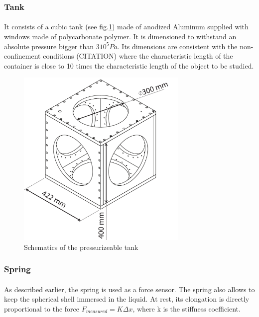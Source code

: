 \subsubsection{Tank}
\paragraph{}
It consists of a cubic tank (see fig.\ref{fig:tank}) made of anodized Aluminum supplied with windows made of polycarbonate polymer. It is dimensioned to withstand an absolute pressure bigger than $3 10^5 Pa$. Its dimensions are consistent with the non-confinement conditions (CITATION) where the characteristic length of the container is close to 10 times the characteristic length of the object to be studied.
\begin{figure}[H] %
	\centering%
  \includegraphics[width=0.73\textwidth]{figures/Chapter_1/cuve.pdf}
	\caption{Schematics of the pressurizeable tank}
	\label{fig:tank}
\end{figure}
\subsubsection{Spring}
\paragraph{}
As described earlier, the spring is used as a force sensor. The spring also allows to keep the spherical shell immersed in the liquid.
At rest, its elongation is directly proportional to the force $F_{measured} = K \Delta x$, where k is the stiffness coefficient.
